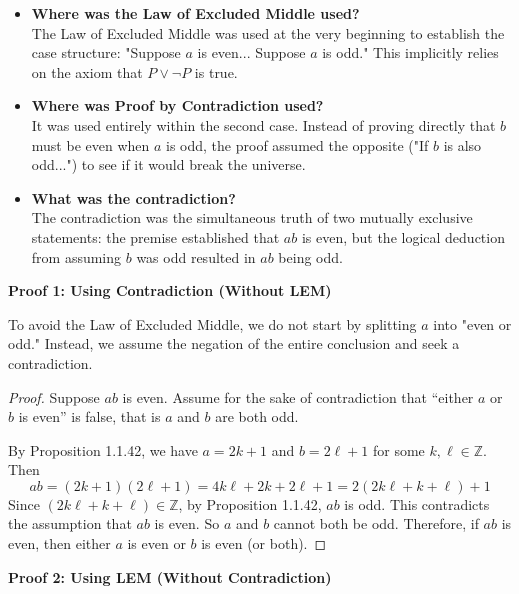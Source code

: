 \begin{solutions*}
\fixlistskip
\begin{itemize}
    \item \textbf{Where was the Law of Excluded Middle used?}\\
        The Law of Excluded Middle was used at the very beginning to establish the case structure: "Suppose $a$ is even... Suppose $a$ is odd." This implicitly relies on the axiom that $P \lor \neg P$ is true.
    \item \textbf{Where was Proof by Contradiction used?}\\
        It was used entirely within the second case. Instead of proving directly that $b$ must be even when $a$ is odd, the proof assumed the opposite ("If $b$ is also odd...") to see if it would break the universe.
    \item \textbf{What was the contradiction?}\\
        The contradiction was the simultaneous truth of two mutually exclusive statements: the premise established that $ab$ is even, but the logical deduction from assuming $b$ was odd resulted in $ab$ being odd.
\end{itemize}
 
\textbf{Proof 1: Using Contradiction (Without LEM)}

To avoid the Law of Excluded Middle, we do not start by splitting $a$ into "even or odd." Instead, we assume the negation of the entire conclusion and seek a contradiction.
\begin{proof}
    Suppose $ab$ is even. Assume for the sake of contradiction that ``either $a$ or $b$ is even'' is false, that is $a$ and $b$ are both odd.

    By Proposition 1.1.42, we have $a = 2k+1$ and $b = 2\ell+1$ for some $k, \ell \in \mathbb{Z}$. Then
    \[ab = (2k+1)(2\ell+1) = 4k\ell + 2k + 2\ell + 1 = 2(2k\ell + k + \ell) + 1\]
    Since $(2k\ell + k + \ell) \in \mathbb{Z}$, by Proposition 1.1.42, $ab$ is odd. This contradicts the assumption that $ab$ is even. So $a$ and $b$ cannot both be odd. Therefore, if $ab$ is even, then either $a$ is even or $b$ is even (or both).
\end{proof}

\textbf{Proof 2: Using LEM (Without Contradiction)}


\end{solutions*}
